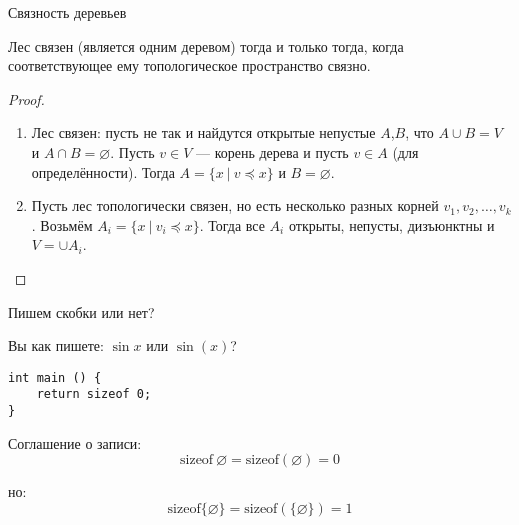 \documentclass[aspectratio=169]{beamer}
\begin{document}
\begin{frame}{Связность деревьев}

\begin{lemmarus}Лес связен (является одним деревом) тогда и только тогда, когда соответствующее ему 
топологическое пространство связно.\end{lemmarus}

\begin{proof}\begin{enumerate}\item Лес связен: пусть не так и найдутся открытые непустые $A$,$B$, что 
$A \cup B = V$ и $A \cap B = \varnothing$. Пусть $v \in V$ --- корень
дерева и пусть $v \in A$ (для определённости). Тогда $A = \{ x \ |\ v \preceq x \}$ и $B = \varnothing$.
\item Пусть лес топологически связен, но есть несколько разных корней $v_1, v_2, \dots, v_k$. 
Возьмём $A_i = \{ x\ |\ v_i \preceq x \}$. Тогда все $A_i$ открыты, непусты, дизъюнктны и $V = \cup A_i$.
\end{enumerate}
\end{proof}
\end{frame}

\begin{frame}[fragile]{Пишем скобки или нет?}

Вы как пишете: $\sin x$ или $\sin (x)$? \pause

\begin{verbatim}
int main () {
    return sizeof 0;
}
\end{verbatim}
\pause

Соглашение о записи:
$$\text{sizeof}\ \varnothing = \text{sizeof}(\varnothing) = 0$$

но:
   $$\text{sizeof}\{\varnothing\} = \text{sizeof}(\{\varnothing\}) = 1$$

\end{frame}
\end{document}
